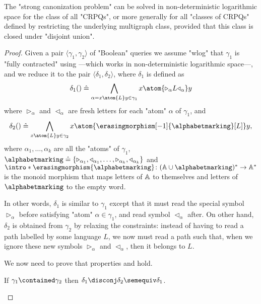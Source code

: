 \begin{lemma}
	\AP\label{lem:canonization-CRPQs}
	The "strong canonization problem" can be solved in non-deterministic logarithmic space for the class of all
	"CRPQs", or more generally for all "classes of CRPQs" defined by restricting the
	underlying multigraph class, provided that this class is closed under "disjoint union".
\end{lemma}

\begin{proof}
	Given a pair $\langle\gamma_1, \gamma_2\rangle$ of "Boolean" queries
	we assume "wlog" that $\gamma_1$ is "fully contracted" using
	---which works in non-deterministic logarithmic space---,
	and we reduce it to the pair $\langle \delta_1, \delta_2 \rangle$,
	where $\delta_1$ is defined as
	\[
		\delta_1() \defeq \bigwedge_{\alpha = x \atom{L} y \in \gamma_1} x \atom{\triangleright_\alpha L \triangleleft_\alpha} y
	\]
	where $\triangleright_\alpha$ and $\triangleleft_\alpha$ are fresh letters for each "atom" $\alpha$ of $\gamma_1$,
	and 
	\[
		\delta_2() \defeq \bigwedge_{x \atom{L} y \in \gamma_2} x \atom{\erasingmorphism[-1]{\alphabetmarking}[L]} y,
	\]
	where $\alpha_1, \hdots, \alpha_k$ are all the "atoms" of $\gamma_1$,
	$\alphabetmarking \defeq \{\triangleright_{\alpha_1},\triangleleft_{\alpha_1}, \hdots,
	\triangleright_{\alpha_k}, \triangleleft_{\alpha_k}\}$ and
	\AP$\intro*\erasingmorphism{\alphabetmarking}\colon (\A\cup \alphabetmarking)^* \to \A^*$
	is the monoid morphism that maps letters of $\mathbb{A}$ to themselves and 
	letters of $\alphabetmarking$ to the empty word.

	In other words, $\delta_1$ is similar to $\gamma_1$ except that it must read the special
	symbol $\triangleright_{\alpha}$ before satisfying "atom" $\alpha \in \gamma_1$,
	and read symbol $\triangleleft_{\alpha}$ after.
	On other hand, $\delta_2$ is obtained from $\gamma_2$ by relaxing the constraints:
	instead of having to read a path labelled by some language $L$,
	we now must read a path such that, when we ignore these new symbols $\triangleright_{\alpha}$
	and $\triangleleft_{\alpha}$, then it belongs to $L$.

	We now need to prove that properties \axiomsCanon{} and \axiomStrongCanonCore{} hold.
	\begin{claim}
		\AP\label{claim:canonization-multigraph-monotonic-l-to-r}
		If $\gamma_1 \contained \gamma_2$ then $\delta_1 \disconj \delta_2 \semequiv \delta_1$.
	\end{claim}
		

\end{proof}

